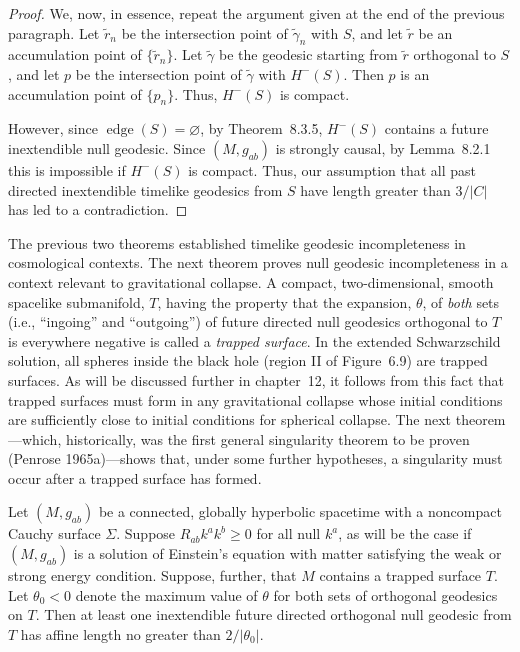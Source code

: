 \begin{proof}


We, now, in essence, repeat the argument given at the end of the previous paragraph.
Let \(\widetilde r_n\) be the intersection point of \(\widetilde\gamma_n\) with \(S\),
and let \(\widetilde r\) be an accumulation point of \(\{\widetilde r_n\}\). Let
\(\widetilde\gamma\) be the geodesic starting from \(\widetilde r\) orthogonal to
\(S\), and let \(p\) be the intersection point of \(\widetilde\gamma\) with
\(H^-(S)\). Then \(p\) is an accumulation point of \(\{p_n\}\). Thus, \(H^-(S)\) is
compact.

However, since \(\operatorname{edge}(S)=\varnothing\), by Theorem~8.3.5,
\(H^-(S)\) contains a future inextendible null geodesic. Since \((M,g_{ab})\) is
strongly causal, by Lemma~8.2.1 this is impossible if \(H^-(S)\) is compact. Thus,
our assumption that all past directed inextendible timelike geodesics from \(S\) have
length greater than \(3/\lvert C\rvert\) has led to a contradiction.
\end{proof}

The previous two theorems established timelike geodesic incompleteness in cosmological
contexts. The next theorem proves null geodesic incompleteness in a context relevant
to gravitational collapse. A compact, two-dimensional, smooth spacelike
submanifold, \(T\), having the property that the expansion, \(\theta\), of \emph{both}
sets (i.e., ``ingoing'' and ``outgoing'') of future directed null geodesics
orthogonal to \(T\) is everywhere negative is called a \emph{trapped surface}. In the
extended Schwarzschild solution, all spheres inside the black hole (region II of
Figure~6.9) are trapped surfaces. As will be discussed further in chapter~12, it
follows from this fact that trapped surfaces must form in any gravitational collapse
whose initial conditions are sufficiently close to initial conditions for spherical
collapse. The next theorem---which, historically, was the first general singularity
theorem to be proven (Penrose 1965a)---shows that, under some further hypotheses, a
singularity must occur after a trapped surface has formed.

\begin{theorem}\label{thm:9.5.3}
Let \((M,g_{ab})\) be a connected, globally hyperbolic spacetime with a noncompact
Cauchy surface \(\Sigma\). Suppose \(R_{ab}k^ak^b\geq0\) for all null \(k^a\), as
will be the case if \((M,g_{ab})\) is a solution of Einstein's equation with matter
satisfying the weak or strong energy condition. Suppose, further, that \(M\) contains
a trapped surface \(T\). Let \(\theta_0<0\) denote the maximum value of \(\theta\)
for both sets of orthogonal geodesics on \(T\). Then at least one inextendible future
directed orthogonal null geodesic from \(T\) has affine length no greater than
\(2/\lvert\theta_0\rvert\).
\end{theorem}

